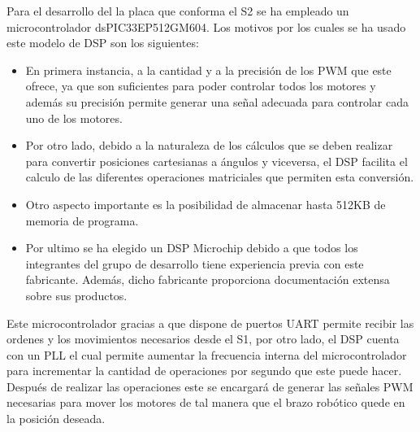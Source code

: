 Para el desarrollo del la placa que conforma el S2 se ha empleado un microcontrolador dsPIC33EP512GM604.
Los motivos por los cuales se ha usado este modelo de DSP son los siguientes: 

\begin{itemize}
\item En primera instancia, a la cantidad y a la precisión de los PWM que este ofrece, ya que son suficientes para poder controlar todos los motores y además su precisión permite generar una señal adecuada para controlar cada uno de los motores.

\item Por otro lado, debido a la naturaleza de los cálculos que se deben realizar para convertir posiciones cartesianas a ángulos y viceversa, el DSP facilita el calculo de las diferentes operaciones matriciales que permiten esta conversión.

\item Otro aspecto importante es la posibilidad de almacenar hasta 512KB de memoria de programa.

\item Por ultimo se ha elegido un DSP Microchip debido a que todos los integrantes del grupo de desarrollo tiene experiencia previa con este fabricante. Además, dicho fabricante proporciona documentación extensa sobre sus productos.

\end{itemize}

Este microcontrolador gracias a que dispone de puertos UART permite recibir las ordenes y los movimientos necesarios desde el S1, por otro lado, el DSP cuenta con un PLL el cual permite aumentar la frecuencia interna del microcontrolador para incrementar la cantidad de operaciones por segundo que este puede hacer. Después de realizar las operaciones este se encargará de generar las señales PWM necesarias para mover los motores de tal manera que el brazo robótico quede en la posición deseada.





    
